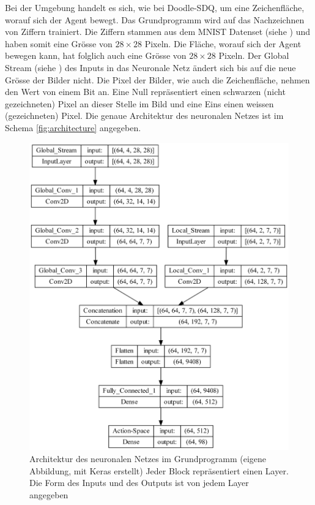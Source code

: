 Bei der Umgebung handelt es sich, wie bei Doodle-SDQ, um eine Zeichenfläche,
worauf sich der Agent bewegt. Das Grundprogramm wird auf das
Nachzeichnen von Ziffern trainiert. Die Ziffern stammen aus dem MNIST Datenset
(siehe ) und haben somit eine Grösse von $28\times28$
Pixeln. Die Fläche, worauf sich der Agent bewegen   
kann, hat folglich auch eine Grösse von $28\times28$ Pixeln. Der Global Stream
(siehe ) des Inputs in das Neuronale Netz ändert sich
bis auf die neue Grösse der Bilder nicht. Die Pixel der Bilder, wie auch die
Zeichenfläche, nehmen den Wert von einem Bit an. Eine Null repräsentiert einen
schwarzen (nicht gezeichneten) Pixel an dieser Stelle im Bild und eine Eins
einen weissen (gezeichneten) Pixel. Die genaue Architektur des neuronalen Netzes
ist im Schema \autoref{fig:architecture} angegeben.

\begin{figure}[!ht]
  \centering
  \includegraphics[width=\textwidth-2cm]{images/methode/architecture.png}
  \caption{Architektur des neuronalen Netzes im Grundprogramm (eigene Abbildung, mit Keras erstellt) Jeder Block repräsentiert einen Layer. Die Form des Inputs und des Outputs ist von jedem Layer angegeben}\label{fig:architecture}
\end{figure}

